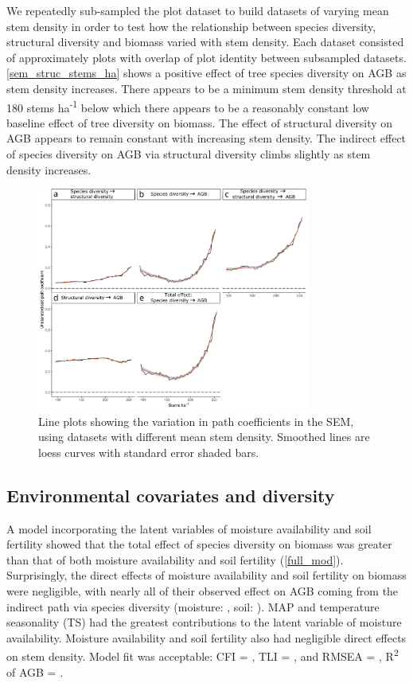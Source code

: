 \documentclass[11pt,a4paper]{article}
\begin{document}
We repeatedly sub-sampled the plot dataset to build \subn{} datasets of varying mean stem density in order to test how the relationship between species diversity, structural diversity and biomass varied with stem density. Each dataset consisted of approximately \subp{} plots with overlap of plot identity between subsampled datasets.  \autoref{sem_struc_stems_ha} shows a positive effect of tree species diversity on AGB as stem density increases. There appears to be a minimum stem density threshold at \textapprox{}180 stems ha\textsuperscript{-1} below which there appears to be a reasonably constant low baseline effect of tree diversity on biomass. The effect of structural diversity on AGB appears to remain constant with increasing stem density. The indirect effect of species diversity on AGB via structural diversity climbs slightly as stem density increases.

\begin{figure}[H]
\centering
	\includegraphics[width=0.8\textwidth]{sem_struc_stems_ha}
	\caption{Line plots showing the variation in path coefficients in the SEM, using datasets with different mean stem density. Smoothed lines are loess curves with standard error shaded bars.}
	\label{sem_struc_stems_ha}
\end{figure}

\subsection{Environmental covariates and diversity}

A model incorporating the latent variables of moisture availability and soil fertility showed that the total effect of species diversity on biomass was greater than that of both moisture availability and soil fertility (\autoref{full_mod}). Surprisingly, the direct effects of moisture availability and soil fertility on biomass were negligible, with nearly all of their observed effect on AGB coming from the indirect path via species diversity (moisture: \rgmbd{}, soil: \rgsbd{}). MAP and temperature seasonality (TS) had the greatest contributions to the latent variable of moisture availability. Moisture availability and soil fertility also had negligible direct effects on stem density.  Model fit was acceptable: CFI = \fmcfi{}, TLI = \fmtli{}, and RMSEA = \fmrmsea{}, R\textsuperscript{2} of AGB = \fmrsq{}.
\end{document}
